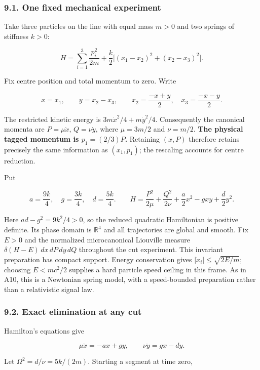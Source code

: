 \documentclass[11pt,a4paper]{article}
\begin{document}
\hypertarget{one-fixed-mechanical-experiment}{%
\subsubsection{9.1. One fixed mechanical
experiment}\label{one-fixed-mechanical-experiment}}

Take three particles on the line with equal mass \(m>0\) and two springs
of stiffness \(k>0\):

\[
H=\sum_{i=1}^3\frac{p_i^2}{2m}
 +\frac{k}{2}\big[(x_1-x_2)^2+(x_2-x_3)^2\big].
\]

Fix centre position and total momentum to zero. Write

\[x=x_1,\qquad y=x_2-x_3,\qquad
x_2=\frac{-x+y}{2},\quad x_3=\frac{-x-y}{2}.\]

The restricted kinetic energy is \(3m\dot x^2/4+m\dot y^2/4\).
Consequently the canonical momenta are \(P=\mu\dot x\), \(Q=\nu\dot y\),
where \(\mu=3m/2\) and \(\nu=m/2\). \textbf{The physical tagged momentum
is \(p_1=(2/3)P\).} Retaining \((x,P)\) therefore retains precisely the
same information as \((x_1,p_1)\); the rescaling accounts for centre
reduction.

Put

\[a=\frac{9k}{4},\quad g=\frac{3k}{4},\quad d=\frac{5k}{4}.
\qquad
H=\frac{P^2}{2\mu}+\frac{Q^2}{2\nu}
 +\frac a2x^2-gxy+\frac d2y^2.\]

Here \(ad-g^2=9k^2/4>0\), so the reduced quadratic Hamiltonian is
positive definite. Its phase domain is \(\mathbb R^4\) and all
trajectories are global and smooth. Fix \(E>0\) and the normalized
microcanonical Liouville measure \(\delta(H-E)\,dx\,dP\,dy\,dQ\)
throughout the cut experiment. This invariant preparation has compact
support. Energy conservation gives \(|\dot x_i|\le\sqrt{2E/m}\);
choosing \(E<mc^2/2\) supplies a hard particle speed ceiling in this
frame. As in A10, this is a Newtonian spring model, with a speed-bounded
preparation rather than a relativistic signal law.

\hypertarget{exact-elimination-at-any-cut}{%
\subsubsection{9.2. Exact elimination at any
cut}\label{exact-elimination-at-any-cut}}

Hamilton's equations give

\[\mu\ddot x=-ax+gy,\qquad \nu\ddot y=gx-dy.\]

Let \(\Omega^2=d/\nu=5k/(2m)\). Starting a segment at time zero,
\end{document}
